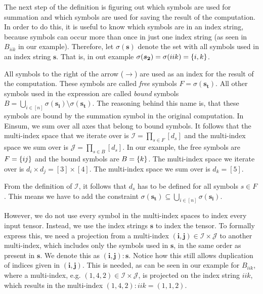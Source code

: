 \begin{definition}
    The next step of the definition is figuring out which symbols are used for summation and which symbols are used for saving the result of the computation.
    In order to do this, it is useful to know which symbols are in an index string, because symbols can occur more than once in just one index string (as seen in $B_{iik}$ in our example).
    Therefore, let $\sigma(\bm{s})$ denote the set with all symbols used in an index string $\bm{s}$.
    That is, in out example $\sigma(\bm{s_2}) = \sigma(iik) = \lbrace i, k \rbrace$.

    All symbols to the right of the arrow ($\rightarrow$) are used as an index for the result of the computation.
    These symbols are called \textit{free} symbols $F = \sigma(\bm{s_t})$.
    All other symbols used in the expression are called \textit{bound} symbols $B = \bigcup_{i \in [n]} \sigma(\bm{s_i}) \setminus \sigma(\bm{s_t})$.
    The reasoning behind this name is, that these symbols are bound by the summation symbol in the original computation.
    In Einsum, we sum over all axes that belong to bound symbols.
    It follows that the multi-index space that we iterate over is $\mathcal{I} = \prod_{s \in F} [d_s]$ and the multi-index space we sum over is $\mathcal{J} = \prod_{s \in B} [d_s]$.
    In our example, the free symbols are $F = \lbrace ij \rbrace$ and the bound symbols are $B = \lbrace k \rbrace$.
    The multi-index space we iterate over is $d_i \times d_j = [3] \times [4]$.
    The multi-index space we sum over is $d_k = [5]$.

    From the definition of $\mathcal{I}$, it follows that $d_s$ has to be defined for all symbols $s \in F$.
    This means we have to add the constraint $\sigma(\bm{s_t}) \subseteq \bigcup_{i \in [n]} \sigma(\bm{s_i})$.

    However, we do not use every symbol in the multi-index spaces to index every input tensor.
    Instead, we use the index strings $\bm{s}$ to index the tensor.
    To formally express this, we need a projection from a multi-index $(\bm{i},\bm{j}) \in \mathcal{I} \times \mathcal{J}$ to another multi-index, which includes only the symbols used in $\bm{s}$,
    in the same order as present in $\bm{s}$.
    We denote this as $(\bm{i},\bm{j}):\bm{s}$.
    Notice how this still allows duplication of indices given in $(\bm{i},\bm{j})$.
    This is needed, as can be seen in our example for $B_{iik}$,
    where a multi-index, e.g. $(1,4,2) \in \mathcal{I} \times \mathcal{J}$, is projected on the index string $iik$,
    which results in the multi-index $(1,4,2):iik = (1,1,2)$.


\end{definition}
